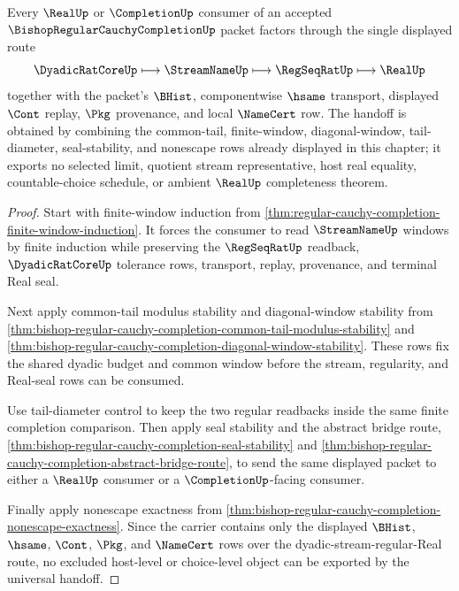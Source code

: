 \begin{theorem}
\label{thm:real-cauchy-completion-universal-handoff}
Every $\RealUp$ or $\CompletionUp$ consumer of an accepted
$\BishopRegularCauchyCompletionUp$ packet factors through the single displayed
route
$$
\DyadicRatCoreUp \longmapsto \StreamNameUp \longmapsto \RegSeqRatUp
\longmapsto \RealUp
$$
together with the packet's $\BHist$, componentwise $\hsame$ transport,
displayed $\Cont$ replay, $\Pkg$ provenance, and local $\NameCert$ row. The
handoff is obtained by combining the common-tail, finite-window,
diagonal-window, tail-diameter, seal-stability, and nonescape rows already
displayed in this chapter; it exports no selected limit, quotient stream
representative, host real equality, countable-choice schedule, or ambient
$\RealUp$ completeness theorem.
\end{theorem}
\begin{proof}
Start with finite-window induction from
\autoref{thm:regular-cauchy-completion-finite-window-induction}. It forces the
consumer to read $\StreamNameUp$ windows by finite induction while preserving
the $\RegSeqRatUp$ readback, $\DyadicRatCoreUp$ tolerance rows, transport,
replay, provenance, and terminal Real seal.

Next apply common-tail modulus stability and diagonal-window stability from
\autoref{thm:bishop-regular-cauchy-completion-common-tail-modulus-stability}
and
\autoref{thm:bishop-regular-cauchy-completion-diagonal-window-stability}. These
rows fix the shared dyadic budget and common window before the stream,
regularity, and Real-seal rows can be consumed.

Use tail-diameter control to keep the two regular readbacks inside the same
finite completion comparison. Then apply seal stability and the abstract bridge
route, \autoref{thm:bishop-regular-cauchy-completion-seal-stability} and
\autoref{thm:bishop-regular-cauchy-completion-abstract-bridge-route}, to send
the same displayed packet to either a $\RealUp$ consumer or a
$\CompletionUp$-facing consumer.

Finally apply nonescape exactness from
\autoref{thm:bishop-regular-cauchy-completion-nonescape-exactness}. Since the
carrier contains only the displayed $\BHist$, $\hsame$, $\Cont$, $\Pkg$, and
$\NameCert$ rows over the dyadic-stream-regular-Real route, no excluded
host-level or choice-level object can be exported by the universal handoff.
\end{proof}

